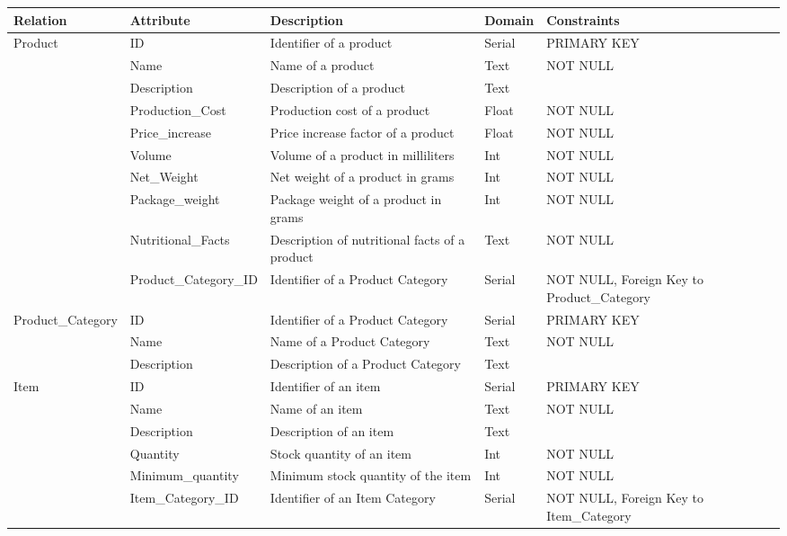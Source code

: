 \begin{longtable}{|p{}|p{} |p{}|p{}|p{} |} 
\hline
\textbf{Relation} & \textbf{Attribute} & \textbf{Description} & \textbf{Domain} & \textbf{Constraints} \\\hline

\multirow{10}{*}{Product} & ID & Identifier of a product & Serial &  PRIMARY KEY\\\cline{2-5}
& Name & Name of a product & Text & NOT NULL \\\cline{2-5}
& Description & Description of a product  & Text &  \\\cline{2-5}
& Production\_Cost & Production cost of a product & Float & NOT NULL \\\cline{2-5}
& Price\_increase & Price increase factor of a product & Float & NOT NULL \\\cline{2-5}
& Volume & Volume of a product in milliliters  & Int & NOT NULL \\\cline{2-5}
& Net\_Weight & Net weight of a product in grams & Int & NOT NULL \\\cline{2-5}
& Package\_weight & Package weight of a product in grams & Int  & NOT NULL \\\cline{2-5}
& Nutritional\_Facts & Description of nutritional facts of a product & Text & NOT NULL \\\cline{2-5}
& Product\_Category\_ID & Identifier of a Product Category & Serial  & NOT NULL, Foreign Key to Product\_Category \\\hline

\multirow{3}{*}{Product\_Category} & ID & Identifier of a Product Category & Serial & PRIMARY KEY \\\cline{2-5}
& Name & Name of a Product Category & Text & NOT NULL \\\cline{2-5}
& Description & Description of a Product Category & Text & \\\hline

\multirow{5}{*}{Item} & ID & Identifier of an item  & Serial & PRIMARY KEY \\\cline{2-5}
& Name & Name of an item & Text & NOT NULL\\\cline{2-5}
& Description & Description of an item & Text & \\\cline{2-5}
& Quantity & Stock quantity of an item & Int & NOT NULL \\\cline{2-5}
& Minimum\_quantity & Minimum stock quantity of the item & Int & NOT NULL \\\cline{2-5}
& Item\_Category\_ID & Identifier of an Item Category & Serial  & NOT NULL, Foreign Key to Item\_Category\\\hline


\end{longtable}
